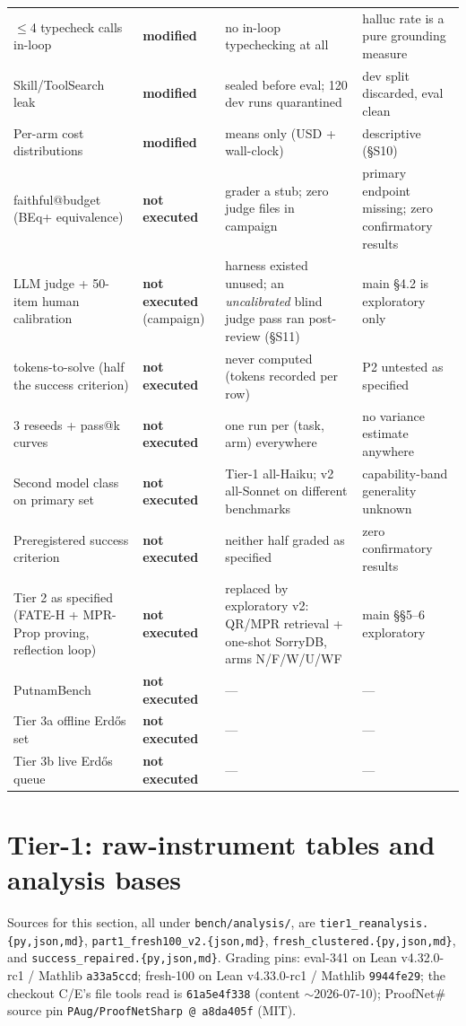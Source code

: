 \documentclass[10pt]{article}
\newcommand{\code}[1]{\texttt{#1}}
\begin{document}
\begin{longtable}{@{}p{}p{}p{}p{}@{}}
$\leq$4 typecheck calls in-loop & \textbf{modified} & no in-loop typechecking at all & halluc rate is a pure grounding measure \\
Skill/ToolSearch leak & \textbf{modified} & sealed before eval; 120 dev runs quarantined & dev split discarded, eval clean \\
Per-arm cost distributions & \textbf{modified} & means only (USD + wall-clock) & descriptive (\S S10) \\
faithful@budget (BEq+ equivalence) & \textbf{not executed} & grader a stub; zero judge files in campaign & primary endpoint missing; zero confirmatory results \\
LLM judge + 50-item human calibration & \textbf{not executed} (campaign) & harness existed unused; an \emph{uncalibrated} blind judge pass ran post-review (\S S11) & main \S 4.2 is exploratory only \\
tokens-to-solve (half the success criterion) & \textbf{not executed} & never computed (tokens recorded per row) & P2 untested as specified \\
3 reseeds + pass@k curves & \textbf{not executed} & one run per (task, arm) everywhere & no variance estimate anywhere \\
Second model class on primary set & \textbf{not executed} & Tier-1 all-Haiku; v2 all-Sonnet on different benchmarks & capability-band generality unknown \\
Preregistered success criterion & \textbf{not executed} & neither half graded as specified & zero confirmatory results \\
Tier 2 as specified (FATE-H + MPR-Prop proving, reflection loop) & \textbf{not executed} & replaced by exploratory v2: QR/MPR retrieval + one-shot SorryDB, arms N/F/W/U/WF & main \S\S 5--6 exploratory \\
PutnamBench & \textbf{not executed} & --- & --- \\
Tier 3a offline Erd\H{o}s set & \textbf{not executed} & --- & --- \\
Tier 3b live Erd\H{o}s queue & \textbf{not executed} & --- & --- \\
\bottomrule
\end{longtable}
\endgroup

\section{Tier-1: raw-instrument tables and analysis bases}\label{s2}

Sources for this section, all under \code{bench/analysis/}, are
\code{tier1\_reanalysis.\{py,json,md\}},
\code{part1\_fresh100\_v2.\{json,md\}},
\code{fresh\_clustered.\{py,json,md\}}, and
\code{success\_repaired.\{py,json,md\}}. Grading pins: eval-341 on Lean
v4.32.0-rc1 / Mathlib \code{a33a5ccd}; fresh-100 on Lean v4.33.0-rc1 /
Mathlib \code{9944fe29}; the checkout C/E's file tools read is
\code{61a5e4f338} (content $\sim$2026-07-10); ProofNet\# source pin
\code{PAug/ProofNetSharp @ a8da405f} (MIT).
\end{document}
